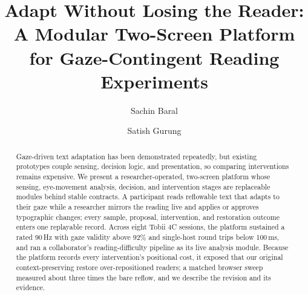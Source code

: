 \documentclass[sigconf,screen]{acmart}
\begin{document}
\title[Adapt Without Losing the Reader]{Adapt Without Losing the Reader: A Modular Two-Screen Platform for Gaze-Contingent Reading Experiments}

\author{Sachin Baral}

\author{Satish Gurung}

\renewcommand{\shortauthors}{Baral and Gurung}

\begin{abstract}
Gaze-driven text adaptation has been demonstrated repeatedly, but existing prototypes couple sensing, decision logic, and presentation, so comparing interventions remains expensive.
We present a researcher-operated, two-screen platform whose sensing, eye-movement analysis, decision, and intervention stages are replaceable modules behind stable contracts.
A participant reads reflowable text that adapts to their gaze while a researcher mirrors the reading live and applies or approves typographic changes; every sample, proposal, intervention, and restoration outcome enters one replayable record.
Across eight Tobii 4C sessions, the platform sustained a rated 90\,Hz with gaze validity above 92\% and single-host round trips below 100\,ms, and ran a collaborator's reading-difficulty pipeline as its live analysis module.
Because the platform records every intervention's positional cost, it exposed that our original context-preserving restore over-repositioned readers; a matched browser sweep measured about three times the bare reflow, and we describe the revision and its evidence.
\end{abstract}
\end{document}
